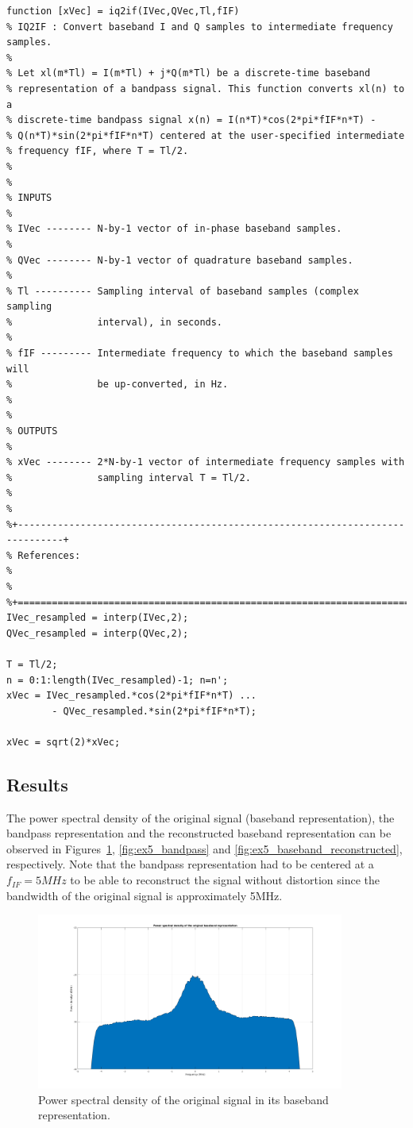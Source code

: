 \begin{lstlisting}
function [xVec] = iq2if(IVec,QVec,Tl,fIF)
% IQ2IF : Convert baseband I and Q samples to intermediate frequency samples.
%
% Let xl(m*Tl) = I(m*Tl) + j*Q(m*Tl) be a discrete-time baseband
% representation of a bandpass signal. This function converts xl(n) to a
% discrete-time bandpass signal x(n) = I(n*T)*cos(2*pi*fIF*n*T) -
% Q(n*T)*sin(2*pi*fIF*n*T) centered at the user-specified intermediate
% frequency fIF, where T = Tl/2.
%
%
% INPUTS
%
% IVec -------- N-by-1 vector of in-phase baseband samples.
%
% QVec -------- N-by-1 vector of quadrature baseband samples.
%
% Tl ---------- Sampling interval of baseband samples (complex sampling
%               interval), in seconds.
%
% fIF --------- Intermediate frequency to which the baseband samples will
%               be up-converted, in Hz.
%
%
% OUTPUTS
%
% xVec -------- 2*N-by-1 vector of intermediate frequency samples with
%               sampling interval T = Tl/2.
%
%
%+------------------------------------------------------------------------------+
% References:
%
%
%+==============================================================================+
IVec_resampled = interp(IVec,2);
QVec_resampled = interp(QVec,2);

T = Tl/2;
n = 0:1:length(IVec_resampled)-1; n=n';
xVec = IVec_resampled.*cos(2*pi*fIF*n*T) ...
        - QVec_resampled.*sin(2*pi*fIF*n*T);

xVec = sqrt(2)*xVec;
\end{lstlisting}

\subsection{Results}

The power spectral density of the original signal (baseband representation),
the bandpass representation and the reconstructed baseband representation can
be observed in Figures~\ref{fig:ex5_baseband_original}, \ref{fig:ex5_bandpass}
and \ref{fig:ex5_baseband_reconstructed}, respectively. Note that the bandpass
representation had to be centered at a $f_{IF} = 5MHz$ to be able to reconstruct
the signal without distortion since the bandwidth of the original signal is
approximately 5MHz.

\begin{figure}[H]
	\centering
	\includegraphics[width=0.9\textwidth]{figs/PSD_baseband_original.png}
	\caption{Power spectral density of the original signal in its baseband
		representation.}
	\label{fig:ex5_baseband_original}
\end{figure}

